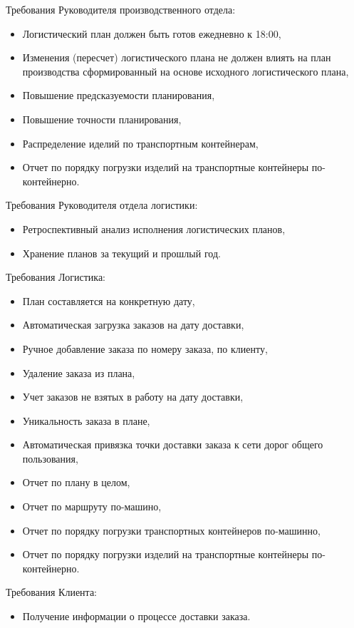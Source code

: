 Требования Руководителя производственного отдела:
\begin{itemize}
    \item Логистический план должен быть готов ежедневно к 18:00,
    \item Изменения (пересчет) логистического плана не должен влиять на план производства сформированный на основе исходного логистического плана,
    \item Повышение предсказуемости планирования,
    \item Повышение точности планирования,
    \item Распределение иделий по транспортным контейнерам,
    \item Отчет по порядку погрузки изделий на транспортные контейнеры по-контейнерно.
\end{itemize}

Требования Руководителя отдела логистики:
\begin{itemize}
    \item Ретроспективный анализ исполнения логистических планов,
    \item Хранение планов за текущий и прошлый год.
\end{itemize}

Требования Логистика:
\begin{itemize}
    \item План составляется на конкретную дату,
    \item Автоматическая загрузка заказов на дату доставки,
    \item Ручное добавление заказа по номеру заказа, по клиенту,
    \item Удаление заказа из плана,
    \item Учет заказов не взятых в работу на дату доставки,
    \item Уникальность заказа в плане,
    \item Автоматическая привязка точки доставки заказа к сети дорог общего пользования,
    \item Отчет по плану в целом,
    \item Отчет по маршруту по-машино,
    \item Отчет по порядку погрузки транспортных контейнеров по-машинно,
    \item Отчет по порядку погрузки изделий на транспортные контейнеры по-контейнерно.
\end{itemize}

Требования Клиента:
\begin{itemize}
    \item Получение информации о процессе доставки заказа.
\end{itemize}

